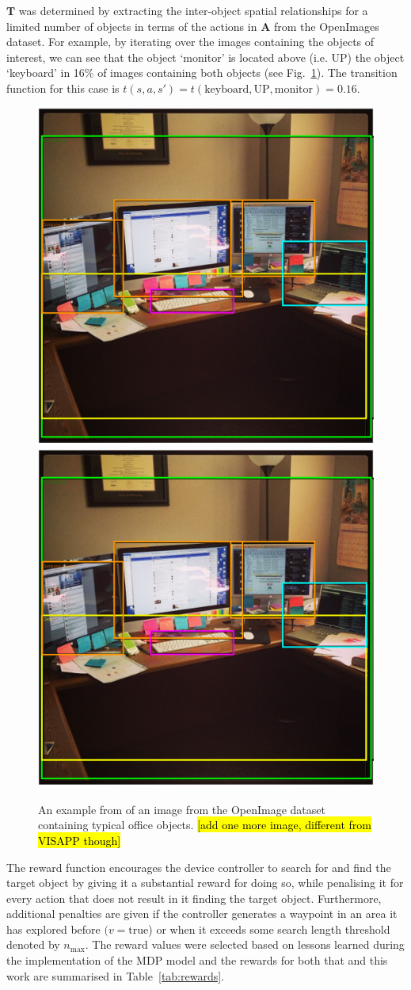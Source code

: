 \documentclass[runningheads]{llncs}
\DeclareRobustCommand{\tofix}[1]{{\sethlcolor{yellow}\hl{[#1]}}}
\begin{document}
$\mathbf{T}$ was determined by extracting the inter-object spatial relationships for a limited number of objects in terms of the actions in $\mathbf{A}$ from the OpenImages~\cite{openimages} dataset. 
For example, by iterating over the images containing the objects of interest, we can see that the object `monitor' is located above (i.e. UP) the object `keyboard' in 16\% of images containing both objects (see Fig.~\ref{fig:openimage}). 
The transition function for this case is $t(s, a, s') = t(\textrm{keyboard}, \textrm{UP}, \textrm{monitor}) = 0.16$.

\begin{figure}[t]
  \centering
  \includegraphics[width=0.45\columnwidth]{figures/desk_example.png} \hfil
  \includegraphics[width=0.45\columnwidth]{figures/desk_example.png}
  \caption{An example from of an image from the OpenImage dataset~\cite{openimages} containing typical office objects. \tofix{add one more image, different from VISAPP though}}\label{fig:openimage}
\end{figure}

The reward function encourages the device controller to search for and find the target object by giving it a substantial reward for doing so, while penalising it for every action that does not result in it finding the target object.
Furthermore, additional penalties are given if the controller generates a waypoint in an area it has explored before $(v = \textrm{true}$) or when it exceeds some search length threshold denoted by $n_{\max}$.
The reward values were selected based on lessons learned during the implementation of the MDP model and the rewards for both that and this work are summarised in Table~\ref{tab:rewards}.
\end{document}

